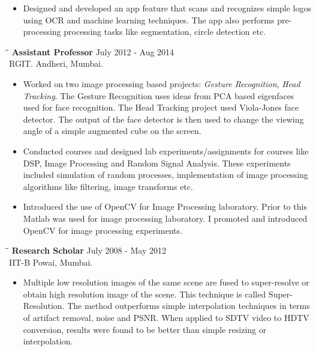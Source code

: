 \documentclass{res}
\begin{document}
\begin{resume}
\begin{itemize}
        \item Designed and developed an app feature that scans and recognizes
        simple logos using OCR and machine learning techniques. The app also performs pre-processing processing tasks like segmentation, circle detection etc. 

\end{itemize}

   \begin{tabbing}
   \hspace{2.3in}\= \hspace{2.6in}\= \kill %
    {\bf Assistant Professor} \> \>July 2012 - Aug 2014\\
                     RGIT.\>     \>Andheri, Mumbai.
   \end{tabbing}
   \begin{itemize}
\item Worked on  two image processing based projects: \textit{Gesture Recognition}, \textit{Head Tracking}. The Gesture Recognition 
uses ideas from PCA based eigenfaces used for face recognition.  The Head Tracking project used Viola-Jones face detector. The output of the face detector is then used to change the viewing angle of a simple augmented cube on the screen.  
  
\item Conducted courses and designed  lab experiments/assignments for courses
like DSP, Image Processing and Random Signal Analysis. These experiments included simulation of random processes,
 implementation of image processing algorithms like filtering, image transforms etc.  

\item Introduced the use of OpenCV for Image Processing laboratory. Prior to this Matlab was used for image processing laboratory. I promoted and introduced OpenCV for image processing experiments. 
\end{itemize}

   \begin{tabbing}%
   \hspace{2.3in}\= \hspace{2.6in}\= \kill %
   {\bf Research Scholar}  \>  \> July 2008 - May 2012\\
                IIT-B\>    \>Powai, Mumbai.
   \end{tabbing}
 \begin{itemize}

\item Multiple low resolution images of the same scene are fused to super-resolve or obtain
high resolution image of the scene. This technique is called Super-Resolution. The method outperforms simple interpolation techniques in terms of  artifact removal, noise and PSNR. When applied to SDTV video to HDTV conversion, results were found to be better than simple resizing or interpolation. 


\end{itemize}
\end{resume}
\end{document}

